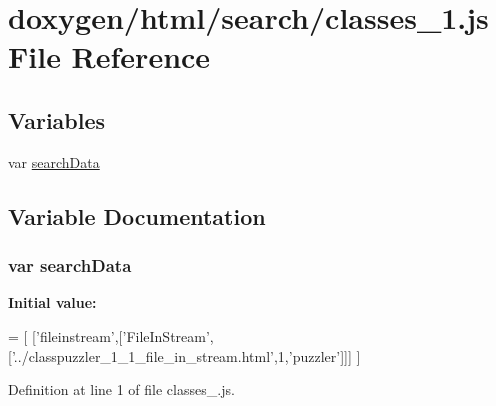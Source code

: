 \hypertarget{a00062}{}\section{doxygen/html/search/classes\+\_\+1.js File Reference}
\label{a00062}
\subsection*{Variables}
\begin{DoxyCompactItemize}
\item 
var \hyperlink{a00062_ad01a7523f103d6242ef9b0451861231e}{search\+Data}
\end{DoxyCompactItemize}


\subsection{Variable Documentation}
\hypertarget{a00062_ad01a7523f103d6242ef9b0451861231e}{}
\subsubsection[{search\+Data}]{\setlength{\rightskip}{0pt plus 5cm}var search\+Data}\label{a00062_ad01a7523f103d6242ef9b0451861231e}
{\bfseries Initial value\+:}
\begin{DoxyCode}
=
[
  [\textcolor{stringliteral}{'fileinstream'},[\textcolor{stringliteral}{'FileInStream'},[\textcolor{stringliteral}{'../classpuzzler\_1\_1\_file\_in\_stream.html'},1,\textcolor{stringliteral}{'puzzler'}]]]
]
\end{DoxyCode}


Definition at line 1 of file classes\+\_.\+js.

